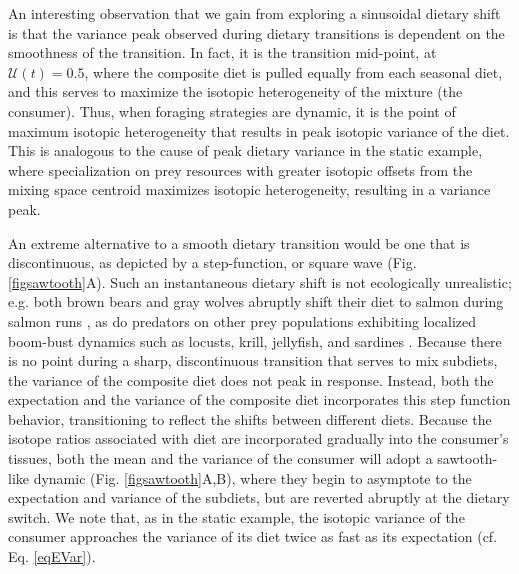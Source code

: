 \documentclass{frontiersSCNS}
\begin{document}
An interesting observation that we gain from exploring a sinusoidal dietary shift is that the variance peak observed during dietary transitions is dependent on the smoothness of the transition.
In fact, it is the transition mid-point, at $\mathcal{U}(t) = 0.5$, where the composite diet is pulled equally from each seasonal diet, and this serves to maximize the isotopic heterogeneity of the mixture (the consumer).
Thus, when foraging strategies are dynamic, it is the point of maximum isotopic heterogeneity that results in peak isotopic variance of the diet.
This is analogous to the cause of peak dietary variance in the static example, where specialization on prey resources with greater isotopic offsets from the mixing space centroid maximizes isotopic heterogeneity, resulting in a variance peak.

An extreme alternative to a smooth dietary transition would be one that is discontinuous, as depicted by a step-function, or square wave (Fig. \ref{figsawtooth}A).
Such an instantaneous dietary shift is not ecologically unrealistic; e.g. both brown bears and gray wolves abruptly shift their diet to salmon during salmon runs \citep{Hilderbrand:1999kq,Darimont:2002ex,Levi:2012ir}, as do predators on other prey populations exhibiting localized boom-bust dynamics such as locusts, krill, jellyfish, and sardines \citep{Dawson:2008hj,Atkinson:2014jm}.
Because there is no point during a sharp, discontinuous transition that serves to mix subdiets, the variance of the composite diet does not peak in response.
Instead, both the expectation and the variance of the composite diet incorporates this step function behavior, transitioning to reflect the shifts between different diets.
Because the isotope ratios associated with diet are incorporated gradually into the consumer's tissues, both the mean and the variance of the consumer will adopt a sawtooth-like dynamic (Fig. \ref{figsawtooth}A,B), where they begin to asymptote to the expectation and variance of the subdiets, but are reverted abruptly at the dietary switch.
We note that, as in the static example, the isotopic variance of the consumer approaches the variance of its diet twice as fast as its expectation (cf. Eq. \ref{eqEVar}).
\end{document}
